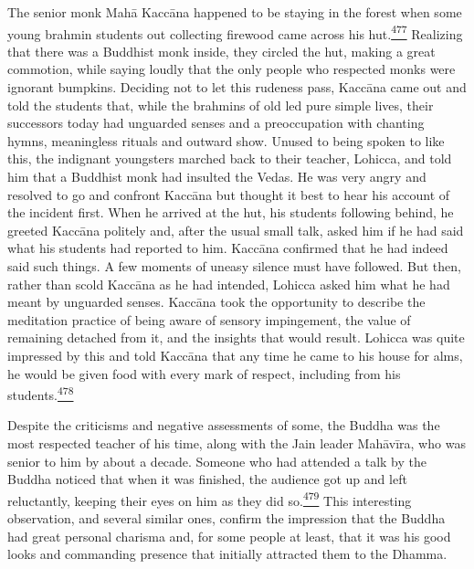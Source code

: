 The senior monk Mahā Kaccāna happened to be staying in the forest when
some young brahmin students out collecting firewood came across his
hut.\label{footprints_split_013.html_fnref477}\hyperref[footprints_split_025.htmlux5cux23fn477]{\textsuperscript{477}}
Realizing that there was a Buddhist monk inside, they circled the hut,
making a great commotion, while saying loudly that the only people who
respected monks were ignorant bumpkins. Deciding not to let this
rudeness pass, Kaccāna came out and told the students that, while the
brahmins of old led pure simple lives, their successors today had
unguarded senses and a preoccupation with chanting hymns, meaningless
rituals and outward show. Unused to being spoken to like this, the
indignant youngsters marched back to their teacher, Lohicca, and told
him that a Buddhist monk had insulted the Vedas. He was very angry and
resolved to go and confront Kaccāna but thought it best to hear his
account of the incident first. When he arrived at the hut, his students
following behind, he greeted Kaccāna politely and, after the usual small
talk, asked him if he had said what his students had reported to him.
Kaccāna confirmed that he had indeed said such things. A few moments of
uneasy silence must have followed. But then, rather than scold Kaccāna
as he had intended, Lohicca asked him what he had meant by unguarded
senses. Kaccāna took the opportunity to describe the meditation practice
of being aware of sensory impingement, the value of remaining detached
from it, and the insights that would result. Lohicca was quite impressed
by this and told Kaccāna that any time he came to his house for alms, he
would be given food with every mark of respect, including from his
students.\label{footprints_split_013.html_fnref478}\hyperref[footprints_split_025.htmlux5cux23fn478]{\textsuperscript{478}}

Despite the criticisms and negative assessments of some, the Buddha was
the most respected teacher of his time, along with the Jain leader
Mahāvīra, who was senior to him by about a decade. Someone who had
attended a talk by the Buddha noticed that when it was finished, the
audience got up and left reluctantly, keeping their eyes on him as they
did
so.\label{footprints_split_013.html_fnref479}\hyperref[footprints_split_025.htmlux5cux23fn479]{\textsuperscript{479}}
This interesting observation, and several similar ones, confirm the
impression that the Buddha had great personal charisma and, for some
people at least, that it was his good looks and commanding presence that
initially attracted them to the Dhamma.

